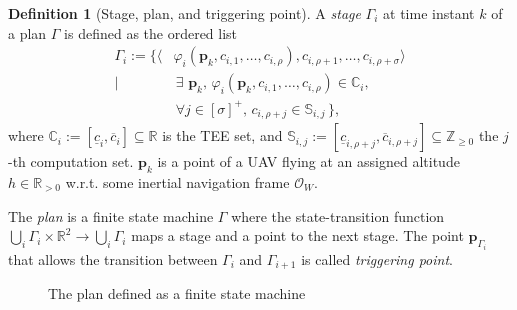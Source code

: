 \documentclass[letterpaper,10pt,conference]{ieeeconf}
\theoremstyle{definition}
\newtheorem{defn}{Definition}[section]
\begin{document}
\begin{defn}[Stage, plan, and triggering point]\label{def:mission}
  A \emph{stage} $\Gamma_i$ at time instant $k$ of a plan $\Gamma$ is defined as the ordered list
  \begin{equation}\label{eq:mission}\begin{split}
    \Gamma_i:=\{\langle&\varphi_i(\mathbf{p}_k,c_{i,1},\dots,c_{i,\rho}),c_{i,\rho+1},\dots,c_{i,\rho+\sigma}\rangle\\\mid
    &\,\exists\,\,\mathbf{p}_k,\,\varphi_i(\mathbf{p}_k,c_{i,1},\dots,c_{i,\rho})\in\mathbb{C}_i,\,\\
      &\,\forall j\in[\sigma]^+,\,c_{i,\rho+j}\in\mathbb{S}_{i,j}\,\},
  \end{split}\end{equation}
  where $\mathbb{C}_i:=[\underline{c}_i,\overline{c}_i]\subseteq\mathbb{R}$ is the TEE set, and $\mathbb{S}_{i,j}:=[\underline{c}_{i,\rho+j},\overline{c}_{i,\rho+j}]\subseteq\mathbb{Z}_{\geq 0}$ the $j$-th computation set. $\mathbf{p}_k$ is a point of a UAV flying at an assigned altitude $h\in\mathbb{R}_{>0}$ w.r.t. some inertial navigation frame $\mathcal{O}_W$.

  The \emph{plan} is a finite state machine $\Gamma$ where the state-transition function $\bigcup_i{\Gamma_i}\times\mathbb{R}^2\rightarrow\bigcup_i{\Gamma_i}$ maps a stage and a point to the next stage. The point $\mathbf{p}_{\Gamma_{i}}$ that allows the transition between $\Gamma_i$ and $\Gamma_{i+1}$ is called \emph{triggering point}.
\end{defn}

\begin{figure}[h]
  \center
  \caption{The plan defined as a finite state machine}
  \label{fig:state-machine}
\end{figure}
\end{document}
